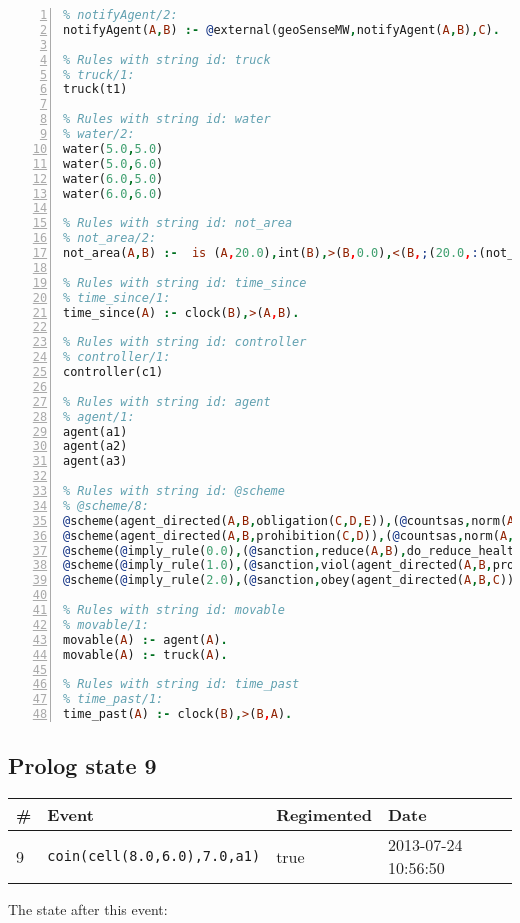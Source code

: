 \documentclass[11pt]{article}\usepackage[utf8]{inputenc}\usepackage{geometry}
\begin{document}
\begin{lstlisting}[language=Prolog, numbers=left]
% Rules with string id: notifyAgent
% notifyAgent/2:
notifyAgent(A,B) :- @external(geoSenseMW,notifyAgent(A,B),C).

% Rules with string id: truck
% truck/1:
truck(t1)

% Rules with string id: water
% water/2:
water(5.0,5.0)
water(5.0,6.0)
water(6.0,5.0)
water(6.0,6.0)

% Rules with string id: not_area
% not_area/2:
not_area(A,B) :-  is (A,20.0),int(B),>(B,0.0),<(B,;(20.0,:(not_area(A,B), is (-(B),20.0)))),int(A),>(A,0.0),<(A,;(20.0,:(area(A,B),-(int(A))))),int(B),>(A,0.0),>(B,0.0),<(A,21.0),<(B,21.0).

% Rules with string id: time_since
% time_since/1:
time_since(A) :- clock(B),>(A,B).

% Rules with string id: controller
% controller/1:
controller(c1)

% Rules with string id: agent
% agent/1:
agent(a1)
agent(a2)
agent(a3)

% Rules with string id: @scheme
% @scheme/8:
@scheme(agent_directed(A,B,obligation(C,D,E)),(@countsas,norm(A,B,F,obligation(C,D,E)),F),false,(listTrue(C)),(time_past(D)),false,[plus(viol(agent_directed(A,B,obligation(C,D,E))))|[]],[plus(obey(agent_directed(A,B,obligation(C,D,E))))|[]])
@scheme(agent_directed(A,B,prohibition(C,D)),(@countsas,norm(A,B,E,prohibition(C,D)),E),(listTrue(C)),false,(false),false,[plus(viol(agent_directed(A,B,prohibition(C,D))))|[]],[plus(obey(agent_directed(A,B,prohibition(C,D))))|[]])
@scheme(@imply_rule(0.0),(@sanction,reduce(A,B),do_reduce_health(A,B),notifyAgent(A,changed(status))),true,false,false,false,[min(reduce(A,B))|[]],[])
@scheme(@imply_rule(1.0),(@sanction,viol(agent_directed(A,B,prohibition(C,D))),do_sanction(D)),true,false,false,false,[min(viol(agent_directed(A,B,prohibition(C,D))))|[]],[])
@scheme(@imply_rule(2.0),(@sanction,obey(agent_directed(A,B,C))),true,false,false,false,[min(obey(agent_directed(A,B,C)))|[]],[])

% Rules with string id: movable
% movable/1:
movable(A) :- agent(A).
movable(A) :- truck(A).

% Rules with string id: time_past
% time_past/1:
time_past(A) :- clock(B),>(B,A).

\end{lstlisting}
\clearpage 
\subsection{Prolog state 9}
\begin{table}[ht]
\centering 
\begin{tabular}{l l l l} 
\textbf{\#} & \textbf{Event} & \textbf{Regimented} & \textbf{Date} \\ [0.5ex] 
\hline
9&\texttt{coin(cell(8.0,6.0),7.0,a1)}&true&2013-07-24 10:56:50\\ [1ex] \hline\end{tabular}
\end{table}
The state after this event:
\end{document}
